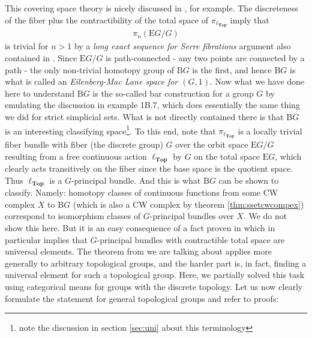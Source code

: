 This covering space theory is nicely discussed in \cite{8b5861fc}, for example.
The discreteness of the fiber plus the contractibility of the total space of $\pi_{\ell_{\mathbf{Top}}}$ imply that
\begin{align*}
  \pi_{n}(\mathrm{E}G \slash G)
\end{align*}
is trivial for $n > 1$ by a \textit{long exact sequence for Serre fibrations} argument also contained in \cite{8b5861fc}.
Since $\mathrm{E}G \slash G$ is path-connected - any two points are connected by a path - the only non-trivial homotopy group of $\mathrm{B}G$ is the first, and hence $\mathrm{B}G$ is what is called an \textit{Eilenberg-Mac Lane space for $(G,1)$}.
Now what we have done here to understand $\mathrm{B}G$ is the so-called {\glqq}bar construction{\grqq} for a group $G$ by emulating the discussion in \cite{8b5861fc} example 1B.7, which does essentially the same thing we did for strict simplicial sets.
What is not directly contained there is that $\mathrm{B}G$ is an interesting classifying space\footnote{note the discussion in section \ref{sec:uni} about this terminology}.
To this end, note that $\pi_{\ell_{\mathbf{Top}}}$ is a locally trivial fiber bundle with fiber (the discrete group) $G$ over the orbit space $\mathrm{E}G \slash G$ resulting from a free continuous action $\ell_{\mathbf{Top}}$ by $G$ on the total space $\mathrm{E}G$, which clearly acts transitively on the fiber since the base space is the quotient space.
Thus $\ell_{\mathbf{Top}}$ is a $G$-principal bundle.
And this is what $\mathrm{B}G$ can be shown to classify.
Namely: homotopy classes of continuous functions from some CW complex $X$ to $\mathrm{B}G$ (which is also a CW complex by theorem \ref{thm:ssetcwcompex}) correspond to isomorphism classes of $G$-principal bundles over $X$.
We do not show this here.
But it is an easy consequence of a fact proven in \cite{4dc38f27} which in particular implies that $G$-principal bundles with contractible total space are universal elements.
The theorem from \cite{4dc38f27} we are talking about applies more generally to arbitrary topological groups, and the harder part is, in fact, finding a universal element for such a topological group.
Here, we partially solved this task using categorical means for groups with the discrete topology.
Let us now clearly formulate the statement for general topological groups and refer to proofs:
\\
